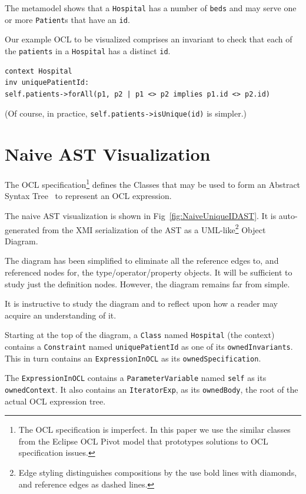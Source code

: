 \documentclass{llncs}
\begin{document}
The metamodel shows that a \verb$Hospital$ has a number of \verb$beds$ and may serve one or more \verb$Patient$s that have an \verb$id$.

Our example OCL to be visualized comprises an invariant to check that each of the \verb$patients$ in a \verb$Hospital$ has a distinct \verb$id$.

\begin{verbatim}
context Hospital
inv uniquePatientId:
self.patients->forAll(p1, p2 | p1 <> p2 implies p1.id <> p2.id)
\end{verbatim}

(Of course, in practice, \verb|self.patients->isUnique(id)| is simpler.)

\section{Naive AST Visualization}\label{Naive AST}

The OCL specification\footnote{The OCL specification is imperfect. In this paper we use the similar classes from the Eclipse OCL Pivot model that prototypes solutions to OCL specification issues.} defines the Classes that may be used to form an Abstract Syntax Tree~\cite{DragonBook} to represent an OCL expression.

The naive AST visualization is shown in Fig~\ref{fig:NaiveUniqueIDAST}. It is auto-generated from the XMI serialization of the AST as a UML-like\footnote{Edge styling distinguishes compositions by the use bold lines with diamonds, and reference edges as dashed lines.} Object Diagram.

The diagram has been simplified to eliminate all the reference edges to, and referenced nodes for, the type/operator/property objects. It will be sufficient to study just the definition nodes. However, the diagram remains far from simple. 

It is instructive to study the diagram and to reflect upon how a reader may acquire an understanding of it.

Starting at the top of the diagram, a \verb$Class$ named \verb$Hospital$ (the context) contains a \verb$Constraint$ named \verb$uniquePatientId$ as one of its \verb$ownedInvariants$. This in turn contains an \verb$ExpressionInOCL$ as its \verb$ownedSpecification$.

The \verb$ExpressionInOCL$ contains a \verb$ParameterVariable$ named \verb$self$ as its \verb$ownedContext$. It also contains an \verb$IteratorExp$, as its \verb$ownedBody$, the root of the actual OCL expression tree.
\end{document}
